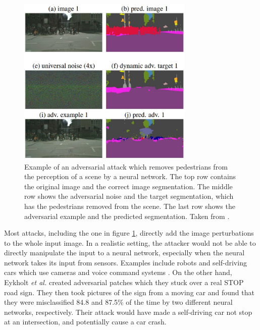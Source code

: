 \begin{figure}[ht]
    \centering
    \includegraphics[width=0.75\textwidth]{graphics/adversarial_segmentation.JPG}
    \caption[Example of an adversarial example against neural network used in self-driving car.]{Example of an adversarial attack which removes pedestrians from the perception of a scene by a neural network. The top row contains the original image and the correct image segmentation. The middle row shows the adversarial noise and the target segmentation, which has the pedestrians removed from the scene. The last row shows the adversarial example and the predicted segmentation. Taken from \cite{Metzen_2017_ICCV}.}
    \label{fig:adversarial_segmentation}
\end{figure}

Most attacks, including the one in figure \ref{fig:adversarial_segmentation}, directly add the image perturbations to the whole input image. In a realistic setting, the attacker would not be able to directly manipulate the input to a neural network, especially when the neural network takes its input from sensors. Examples include robots and self-driving cars which use cameras and voice command systems \cite{kurakin2016adversarial}. On the other hand, Eykholt \textit{et al.} \cite{evtimov_road_signs} created adversarial patches which they stuck over a real STOP road sign. They then took pictures of the sign from a moving car and found that they were misclassified 84.8 and 87.5\% of the time by two different neural networks, respectively. Their attack would have made a self-driving car not stop at an intersection, and potentially cause a car crash.

